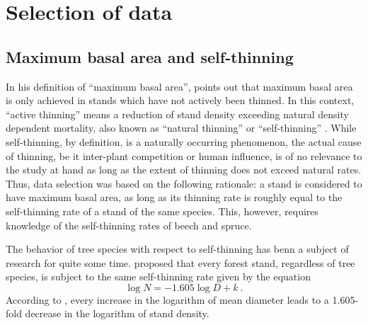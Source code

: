 \section{Selection of data}

\subsection{Maximum basal area and self-thinning}

In his definition of ``maximum basal area'', \textcite{Assmann1970} points out that maximum basal area is only achieved in stands which have not actively been thinned.  In this context, ``active thinning'' means a reduction of stand density exceeding natural density dependent mortality, also known as ``natural thinning'' \parencite{SAF1958} or ``self-thinning'' \parencite{Roehrig1992}.  While self-thinning, by definition, is a naturally occurring phenomenon, the actual cause of thinning, be it inter-plant competition or human influence, is of no relevance to the study at hand as long as the extent of thinning does not exceed natural rates.  Thus, data selection was based on the following rationale: a stand is considered to have maximum basal area, as long as its thinning rate is roughly equal to the self-thinning rate of a stand of the same species.  This, however, requires knowledge of the self-thinning rates of beech and spruce.

The behavior of tree species with respect to self-thinning has benn a subject of research for quite some time.  \textcite{Reineke1933} proposed that every forest stand, regardless of tree species, is subject to the same self-thinning rate given by the equation
\begin{equation}
  \label{eq:reineke}
  \log N = -1.605 \log D + k ~.
\end{equation}
According to , every increase in the logarithm of mean diameter leads to a 1.605-fold decrease in the logarithm of stand density.

